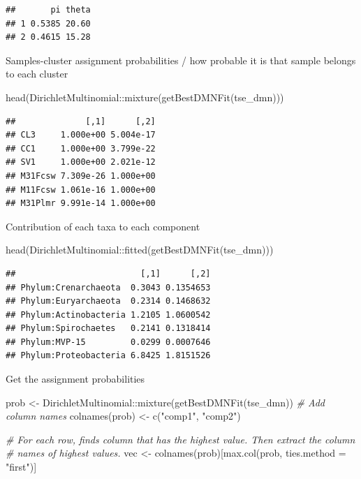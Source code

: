 \documentclass[
]{book}
\newenvironment{Shaded}{\begin{snugshade}}{\end{snugshade}}
\newcommand{\AttributeTok}[1]{\textcolor[rgb]{0.77,0.63,0.00}{#1}}
\newcommand{\CommentTok}[1]{\textcolor[rgb]{0.56,0.35,0.01}{\textit{#1}}}
\newcommand{\FunctionTok}[1]{\textcolor[rgb]{0.00,0.00,0.00}{#1}}
\newcommand{\NormalTok}[1]{#1}
\newcommand{\OtherTok}[1]{\textcolor[rgb]{0.56,0.35,0.01}{#1}}
\newcommand{\SpecialCharTok}[1]{\textcolor[rgb]{0.00,0.00,0.00}{#1}}
\newcommand{\StringTok}[1]{\textcolor[rgb]{0.31,0.60,0.02}{#1}}
\begin{document}
\begin{verbatim}
##       pi theta
## 1 0.5385 20.60
## 2 0.4615 15.28
\end{verbatim}

Samples-cluster assignment probabilities / how probable it is that sample belongs
to each cluster

\begin{Shaded}
\begin{Highlighting}[]
\FunctionTok{head}\NormalTok{(DirichletMultinomial}\SpecialCharTok{::}\FunctionTok{mixture}\NormalTok{(}\FunctionTok{getBestDMNFit}\NormalTok{(tse\_dmn)))}
\end{Highlighting}
\end{Shaded}

\begin{verbatim}
##              [,1]      [,2]
## CL3     1.000e+00 5.004e-17
## CC1     1.000e+00 3.799e-22
## SV1     1.000e+00 2.021e-12
## M31Fcsw 7.309e-26 1.000e+00
## M11Fcsw 1.061e-16 1.000e+00
## M31Plmr 9.991e-14 1.000e+00
\end{verbatim}

Contribution of each taxa to each component

\begin{Shaded}
\begin{Highlighting}[]
\FunctionTok{head}\NormalTok{(DirichletMultinomial}\SpecialCharTok{::}\FunctionTok{fitted}\NormalTok{(}\FunctionTok{getBestDMNFit}\NormalTok{(tse\_dmn)))}
\end{Highlighting}
\end{Shaded}

\begin{verbatim}
##                         [,1]      [,2]
## Phylum:Crenarchaeota  0.3043 0.1354653
## Phylum:Euryarchaeota  0.2314 0.1468632
## Phylum:Actinobacteria 1.2105 1.0600542
## Phylum:Spirochaetes   0.2141 0.1318414
## Phylum:MVP-15         0.0299 0.0007646
## Phylum:Proteobacteria 6.8425 1.8151526
\end{verbatim}

Get the assignment probabilities

\begin{Shaded}
\begin{Highlighting}[]
\NormalTok{prob }\OtherTok{\textless{}{-}}\NormalTok{ DirichletMultinomial}\SpecialCharTok{::}\FunctionTok{mixture}\NormalTok{(}\FunctionTok{getBestDMNFit}\NormalTok{(tse\_dmn))}
\CommentTok{\# Add column names}
\FunctionTok{colnames}\NormalTok{(prob) }\OtherTok{\textless{}{-}} \FunctionTok{c}\NormalTok{(}\StringTok{"comp1"}\NormalTok{, }\StringTok{"comp2"}\NormalTok{)}

\CommentTok{\# For each row, finds column that has the highest value. Then extract the column}
\CommentTok{\# names of highest values.}
\NormalTok{vec }\OtherTok{\textless{}{-}} \FunctionTok{colnames}\NormalTok{(prob)[}\FunctionTok{max.col}\NormalTok{(prob, }\AttributeTok{ties.method =} \StringTok{"first"}\NormalTok{)]}
\end{Highlighting}
\end{Shaded}
\end{document}
